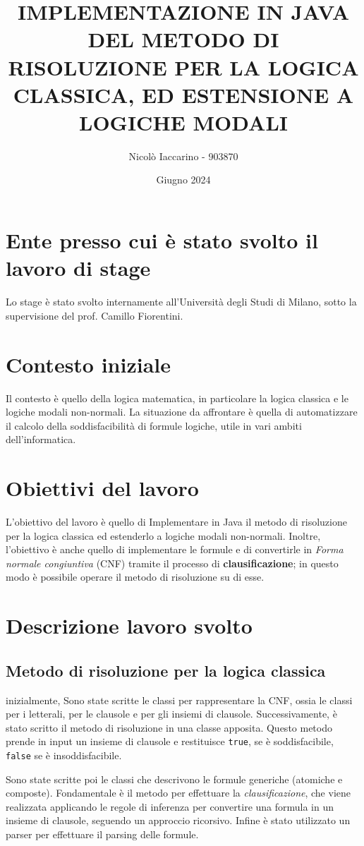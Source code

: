 \documentclass[a4paper,12pt]{article}
\title{IMPLEMENTAZIONE IN JAVA DEL METODO DI RISOLUZIONE PER LA LOGICA CLASSICA, ED ESTENSIONE A LOGICHE MODALI}
\author{Nicolò Iaccarino - 903870}
\date{Giugno 2024}
\begin{document}
\maketitle

\section{Ente presso cui è stato svolto il lavoro di stage}
Lo stage è stato svolto internamente all'Università degli Studi di Milano, sotto la supervisione del prof. Camillo Fiorentini.

\section{Contesto iniziale}
Il contesto è quello della logica matematica, in particolare la logica classica e le logiche modali non-normali. La situazione da affrontare è quella di automatizzare il calcolo della soddisfacibilità di formule logiche, utile in vari ambiti dell'informatica.

\section{Obiettivi del lavoro}
L'obiettivo del lavoro è quello di Implementare in Java il metodo di risoluzione per la logica classica ed estenderlo a logiche modali non-normali. Inoltre, l'obiettivo è anche quello di implementare le formule e di convertirle in \emph{Forma normale congiuntiva} (CNF) tramite il processo di \textbf{clausificazione}; in questo modo è possibile operare il metodo di risoluzione su di esse.

\section{Descrizione lavoro svolto}
\subsection*{Metodo di risoluzione per la logica classica}
inizialmente, Sono state scritte le classi per rappresentare la CNF, ossia le classi per i letterali, per le clausole e per gli insiemi di clausole. Successivamente, è stato scritto il metodo di risoluzione in una classe apposita. Questo metodo prende in input un insieme di clausole e restituisce \texttt{true}, se è soddisfacibile, \texttt{false} se è insoddisfacibile.

Sono state scritte poi le classi che descrivono le formule generiche (atomiche e composte). Fondamentale è il metodo per effettuare la \emph{clausificazione}, che viene realizzata applicando le regole di inferenza per convertire una formula in un insieme di clausole, seguendo un approccio ricorsivo. Infine è stato utilizzato un parser per effettuare il parsing delle formule.
\end{document}
